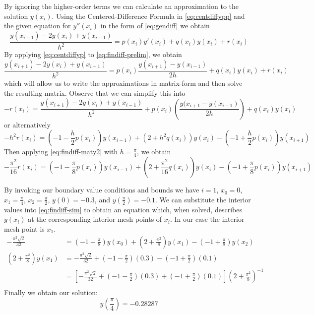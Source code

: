 \documentclass[12pt]{article}
\begin{document}
By ignoring the higher-order terms we can calculate an approximation
to the solution $y(x_i)$. Using the Centered-Difference Formula in
\cref{eq:centdiffypp} and the given equation for $y''(x_i)$ in the
form of \cref{eq:gendiff} we obtain
\begin{equation}
  \label{eq:findiff-prelim}
    \frac{y(x_{i+1})-2y(x_i)+y(x_{i-1})}{h^2} = p(x_i)y'(x_i)+q(x_i)y(x_i)+r(x_i)
\end{equation}
By applying \cref{eq:centdiffyp} to \cref{eq:findiff-prelim}, we obtain
\begin{equation}
  \label{eq:findiff}
  \frac{y(x_{i+1})-2y(x_i)+y(x_{i-1})}{h^2}=p(x_i)\frac{y(x_{i+1}) -
    y(x_{i-1})}{2h}+q(x_i)y(x_i) + r(x_i)
\end{equation}
which will allow us to write the approximations in matrix-form and
then solve the resulting matrix. Observe that we can simplify this
into
\begin{equation*}
  \label{eq:findiff-maty}
    -r(x_i) = \frac{y(x_{i+1})-2y(x_i)+y(x_{i-1})}{h^2} +
    p(x_i)\left(\frac{y(x_{i+1}-y(x_{i-1})}{2h}\right)+q(x_i)y(x_i)
\end{equation*}
or alternatively
\begin{equation}
  \label{eq:findiff-maty2}
  -h^2r(x_i) = \left(-1-\frac{h}{2}p(x_i)\right)y(x_{i-1}) +
  \left(2+h^2q(x_i)\right)y(x_i) - \left(-1+\frac{h}{2}p(x_i)\right)y(x_{i+1})
\end{equation}
Then applying \cref{eq:findiff-maty2} with $h=\frac{\pi}{4}$, we obtain
\begin{equation}
  \label{eq:findiff-sim}
  -\frac{\pi^2}{16}r(x_i) = \left(-1-\frac{\pi}{8}p(x_i)\right)y(x_{i-1}) +
  \left(2+\frac{\pi^2}{16}q(x_i)\right)y(x_i) - \left(-1+\frac{\pi}{8}p(x_i)\right)y(x_{i+1})
\end{equation}

By invoking our boundary value conditions and bounds we have $i=1$,
$x_0=0$, $x_1=\frac{\pi}{4}$, $x_2=\frac{\pi}{2}$, $y(0)=-0.3$, and
$y\left(\frac{\pi}{2}\right) = -0.1$. We can substitute the interior
values into \cref{eq:findiff-sim} to obtain an equation which, when
solved, describes $y(x_i)$ at the corresponding interior mesh points
of $x_i$. In our case the interior mesh point is $x_1$.
\begin{equation}
  \label{eq:findiff-values}
  \begin{aligned}
    -\frac{\pi^2\sqrt{2}}{32} &= \left(-1-\frac{\pi}{8}\right)y(x_0) +
    \left(2+\frac{\pi^2}{8}\right)y(x_1) -
    \left(-1+\frac{\pi}{8}\right)y(x_2) \\
    \left(2+\frac{\pi^2}{8}\right)y(x_1) &= -\frac{\pi^2\sqrt{2}}{32}
    + \left(-1-\frac{\pi}{2}\right)(0.3) -
    \left(-1+\frac{\pi}{2}\right)(0.1) \\
    &= \left[-\frac{\pi^2\sqrt{2}}{32} +
      \left(-1-\frac{\pi}{2}\right)(0.3) +
      \left(-1+\frac{\pi}{2}\right)(0.1)\right]\left(2+\frac{\pi^2}{8}\right)^{-1} \\
  \end{aligned}
\end{equation}
Finally we obtain our solution:
\begin{equation*}
  \boxed{
    y\left(\frac{\pi}{4}\right) = -0.28287
}
\end{equation*}
\end{document}
